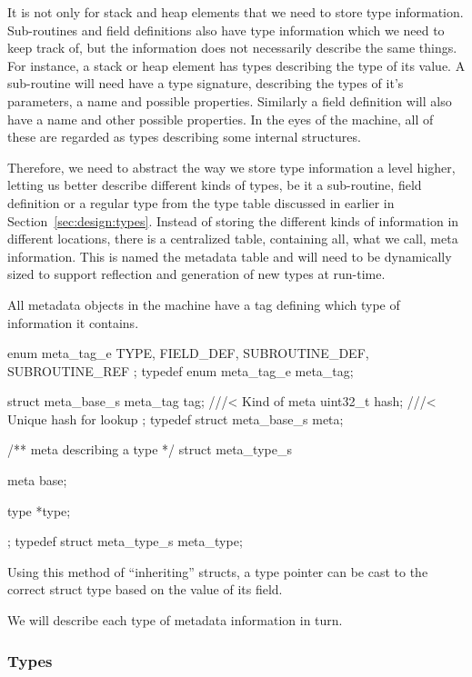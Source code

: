 It is not only for stack and heap elements that we need to store type
information. Sub-routines and field definitions also have type information which
we need to keep track of, but the information does not necessarily describe the
same things. For instance, a stack or heap element has types describing the type
of its value. A sub-routine will need have a type signature, describing the
types of it's parameters, a name and possible properties. Similarly a field
definition will also have a name and other possible properties. In the eyes of
the machine, all of these are regarded as types describing some internal
structures.

Therefore, we need to abstract the way we store type information a level higher,
letting us better describe different kinds of types, be it a sub-routine, field
definition or a regular type from the type table discussed in earlier in
Section~\ref{sec:design:types}. Instead of storing the different kinds of
information in different locations, there is a centralized table, containing
all, what we call, meta information. This is named the metadata table and will
need to be dynamically sized to support reflection and generation of new types
at run-time.

All metadata objects in the machine have a tag defining which type of
information it contains.

\begin{minipage}{\linewidth}
\begin{ccode}
enum meta_tag_e {
    TYPE,
    FIELD_DEF,
    SUBROUTINE_DEF,
    SUBROUTINE_REF
};
typedef enum meta_tag_e meta_tag;

struct meta_base_s {
    meta_tag tag;  ///< Kind of meta
    uint32_t hash; ///< Unique hash for lookup
};
typedef struct meta_base_s meta;

/** \brief meta describing a type */
struct meta_type_s {
    meta base;

    type *type;
};
typedef struct meta_type_s meta_type;
\end{ccode}
\end{minipage}

Using this method of ``inheriting'' structs, a type pointer can be cast to the
correct struct type based on the value of its  field.

We will describe each type of metadata information in turn.

\subsubsection{Types}
\label{sec:implementation:meta:types}

